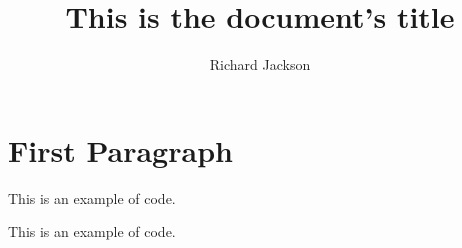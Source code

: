 \documentclass[12pt,letterpaper]{article}
\title{This is the document’s title}
\author{Richard Jackson}
\begin{document}
\section{First Paragraph}
\begin{flushleft}
This is an example of code.
\end{flushleft}

\pagebreak
\begin{flushright}
This is an example of code.
\end{flushright}

\end{document}
